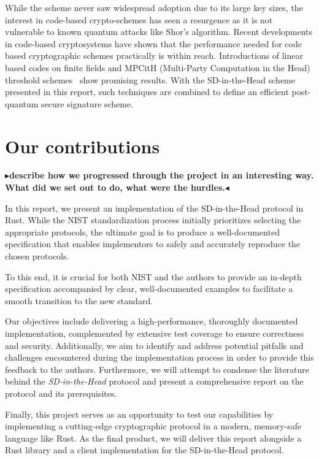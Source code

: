 \documentclass[twoside,11pt]{report}
\theoremstyle{definition}
\theoremstyle{plain}
\newcommand{\todo}[1]{{\color[rgb]{.5,0,0}\textbf{$\blacktriangleright$#1$\blacktriangleleft$}}}
\begin{document}
While the scheme never saw widespread adoption due to its large key sizes, the interest in code-based crypto-schemes has seen a resurgence as it is not vulnerable to known quantum attacks like Shor's algorithm. Recent developments in code-based cryptosystems have shown that the performance needed for code based cryptographic schemes practically is within reach. Introductions of linear based codes on finite fields and MPCitH (Multi-Party Computation in the Head) threshold schemes~\cite{baum2020concretely} show promising results. With the SD-in-the-Head scheme~\cite{aguilarsyndrome11,feneuil2023threshold} presented in this report, such techniques are combined to define an efficient post-quantum secure signature scheme.

\section{Our contributions}

\todo{describe how we progressed through the project in an interesting way. What did we set out to do, what were the hurdles.}

In this report, we present an implementation of the SD-in-the-Head protocol in Rust. While the NIST standardization process initially prioritizes selecting the appropriate protocols, the ultimate goal is to produce a well-documented specification that enables implementors to safely and accurately reproduce the chosen protocols.

To this end, it is crucial for both NIST and the authors to provide an in-depth specification accompanied by clear, well-documented examples to facilitate a smooth transition to the new standard.

Our objectives include delivering a high-performance, thoroughly documented implementation, complemented by extensive test coverage to ensure correctness and security. Additionally, we aim to identify and address potential pitfalls and challenges encountered during the implementation process in order to provide this feedback to the authors. Furthermore, we will attempt to condense the literature behind the \emph{SD-in-the-Head} protocol and present a comprehensive report on the protocol and its prerequisites.

Finally, this project serves as an opportunity to test our capabilities by implementing a cutting-edge cryptographic protocol in a modern, memory-safe language like Rust. As the final product, we will deliver this report alongside a Rust library and a client implementation for the SD-in-the-Head protocol.
\end{document}
